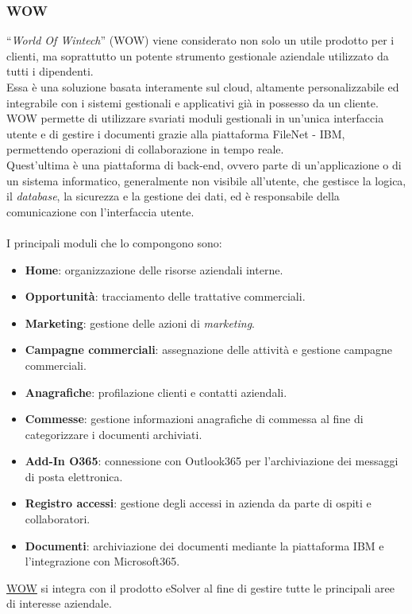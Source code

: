 \subsubsection*{WOW}
\label{WOW}
“\emph{World Of Wintech}” (WOW) viene considerato non solo un utile prodotto per i clienti, ma soprattutto un potente strumento gestionale aziendale utilizzato da tutti i dipendenti.\\ 
Essa è una soluzione basata interamente sul \gls{cloud}, altamente personalizzabile ed integrabile con i sistemi gestionali e applicativi già in possesso da un cliente.\\
WOW permette di utilizzare svariati moduli gestionali in un'unica interfaccia utente e di gestire i documenti grazie alla piattaforma FileNet - IBM, permettendo operazioni di collaborazione in tempo reale.\\
Quest'ultima è una piattaforma di \gls{back-end}, ovvero parte di un'applicazione o di un sistema informatico, generalmente non visibile all'utente, che gestisce la logica, il \emph{database}, la sicurezza e la gestione dei dati, ed è responsabile della comunicazione con l'interfaccia utente.\\\\
I principali moduli che lo compongono sono: 

\begin{itemize}
    \item \textbf{Home}: organizzazione delle risorse aziendali interne. 
    \item \textbf{Opportunità}: tracciamento delle trattative commerciali. 
    \item \textbf{Marketing}: gestione delle azioni di \emph{marketing}. 
    \item \textbf{Campagne commerciali}: assegnazione delle attività e gestione campagne commerciali.
    \item \textbf{Anagrafiche}: profilazione clienti e contatti aziendali. 
    \item \textbf{Commesse}: gestione informazioni anagrafiche di commessa al fine di categorizzare i documenti archiviati.
    \item \textbf{Add-In O365}: connessione con Outlook365 per l'archiviazione dei messaggi di posta elettronica.
    \item \textbf{Registro accessi}: gestione degli accessi in azienda da parte di ospiti e collaboratori.
    \item \textbf{Documenti}: archiviazione dei documenti mediante la piattaforma IBM e l'integrazione con Microsoft365.\\
\end{itemize}
\hyperref[WOW]{WOW} si integra con il prodotto eSolver al fine di gestire tutte le principali aree di interesse aziendale.\\

